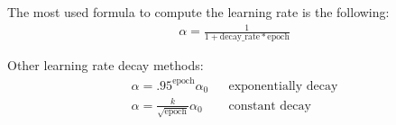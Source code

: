 The most used formula to compute the learning rate is the following:
\begin{align*}
    \alpha = \frac{1}{1 + \text{decay\_rate}*\text{epoch}}
\end{align*}

Other learning rate decay methods:
\begin{align*}
    \alpha = .95^{\text{epoch}}\alpha_0 && \text{exponentially decay} \\
    \alpha = \frac{k}{\sqrt{\text{epoch}}}\alpha_0 && \text{constant decay} 
\end{align*}

